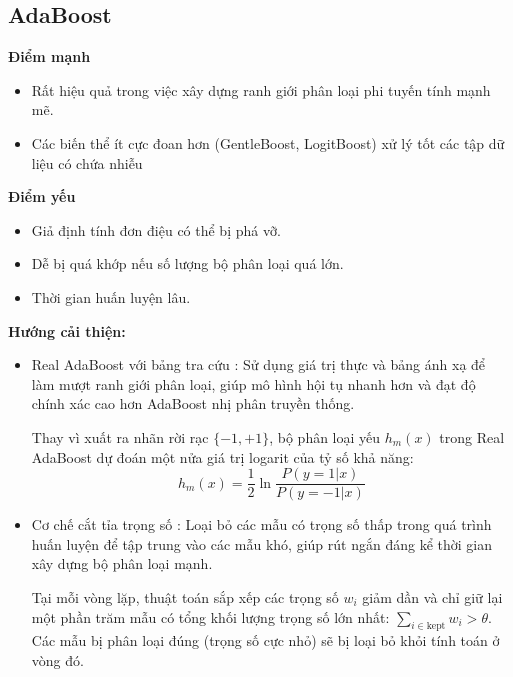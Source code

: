 \subsection{AdaBoost}
\textbf{Điểm mạnh}
\begin{itemize}
    \item Rất hiệu quả trong việc xây dựng ranh giới phân loại phi tuyến tính mạnh mẽ.
    \item Các biến thể ít cực đoan hơn (GentleBoost, LogitBoost) xử lý tốt các tập dữ liệu có chứa nhiễu
\end{itemize}
\textbf{Điểm yếu}
\begin{itemize}
    \item Giả định tính đơn điệu có thể bị phá vỡ.
    \item Dễ bị quá khớp nếu số lượng bộ phân loại quá lớn.
    \item Thời gian huấn luyện lâu.
\end{itemize}
\textbf{Hướng cải thiện:}
\begin{itemize}
  \item Real AdaBoost với bảng tra cứu \cite{wu2004fast}: Sử dụng giá trị thực và bảng ánh xạ để làm mượt ranh giới phân loại, giúp mô hình hội tụ nhanh hơn và đạt độ chính xác cao hơn AdaBoost nhị phân truyền thống.
  
  Thay vì xuất ra nhãn rời rạc $\{-1, +1\}$, bộ phân loại yếu $h_m(x)$ trong Real AdaBoost dự đoán một nửa giá trị logarit của tỷ số khả năng:
    \begin{equation}
        h_m(x) = \frac{1}{2} \ln \frac{P(y=1|x)}{P(y=-1|x)}
    \end{equation}
  
  \item Cơ chế cắt tỉa trọng số \cite{friedman2000additive}: Loại bỏ các mẫu có trọng số thấp trong quá trình huấn luyện để tập trung vào các mẫu khó, giúp rút ngắn đáng kể thời gian xây dựng bộ phân loại mạnh.

  Tại mỗi vòng lặp, thuật toán sắp xếp các trọng số $w_i$ giảm dần và chỉ giữ lại một phần trăm mẫu có tổng khối lượng trọng số lớn nhất: $\sum_{i \in \text{kept}} w_i > \theta$. Các mẫu bị phân loại đúng (trọng số cực nhỏ) sẽ bị loại bỏ khỏi tính toán ở vòng đó.
\end{itemize}

